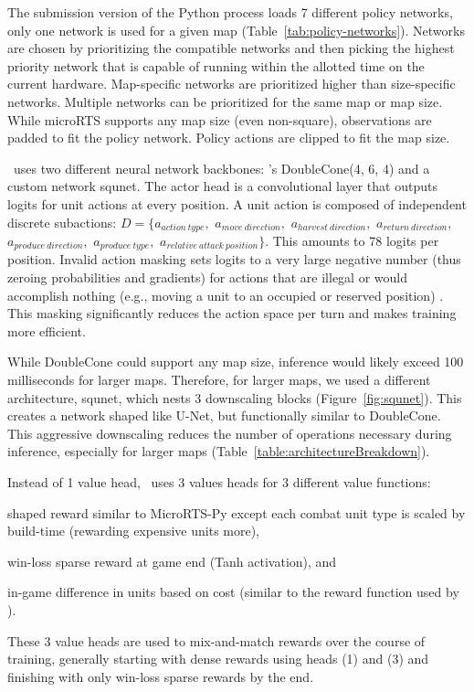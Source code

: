 \documentclass{article}
\begin{document}
The submission version of the Python process loads 7 different policy networks, only one network is used
for a given map (Table~\ref{tab:policy-networks}). Networks are chosen by prioritizing
the compatible networks and then picking the highest priority network that is capable of
running within the allotted time on the current hardware. Map-specific networks are
prioritized higher than size-specific networks. Multiple networks can be prioritized for
the same map or map size. While microRTS supports any map size (even non-square),
observations are padded to fit the policy network. Policy actions are clipped to fit the
map size.

\agentName\ uses two different neural network backbones:
\citet{Ferdinand2021doublecone}'s DoubleCone(4, 6, 4) and a custom network
squnet. The actor head is a convolutional layer
that outputs logits for unit actions at every position. A unit action is composed of
independent discrete subactions: $D = \{a_{action\ type},$ $a_{move\ direction},$ $a_{harvest\
direction},$ $a_{return\ direction},$ $a_{produce\ direction},$ $a_{produce\ type},$ $a_{relative\
attack\ position}\}$. This amounts to 78 logits per position. Invalid action masking sets
logits to a very large negative number (thus zeroing probabilities and gradients) for actions that are
illegal or would accomplish nothing (e.g., moving a unit to an occupied or reserved
position) \citep{DBLP:journals/corr/abs-2006-14171}. This masking significantly reduces
the action space per turn and makes training more efficient.

While DoubleCone could support any map size, inference would likely exceed 100
milliseconds for larger maps. Therefore, for larger maps, we used a different
architecture, squnet, which nests 3 downscaling blocks (Figure~\ref{fig:squnet}). This 
creates a network shaped like U-Net, but functionally similar to DoubleCone.
This aggressive downscaling reduces the number of operations necessary during inference,
especially for larger maps (Table~\ref{table:architectureBreakdown}).

Instead of 1 value head, \agentName\ uses 3 values heads for 3 different value
functions:
\begin{inparaenum}[(1)]
    \item shaped reward similar to MicroRTS-Py except each combat unit type is
    scaled by build-time (rewarding expensive units more),
    \item win-loss sparse reward at game end (Tanh activation), and
    \item in-game difference in units based on cost (similar to the reward function used
    by \citet{Winter2021}).
\end{inparaenum}
These 3 value heads are used to mix-and-match rewards over the course of training,
generally starting with dense rewards using heads (1) and (3) and finishing with only
win-loss sparse rewards by the end.
\end{document}
